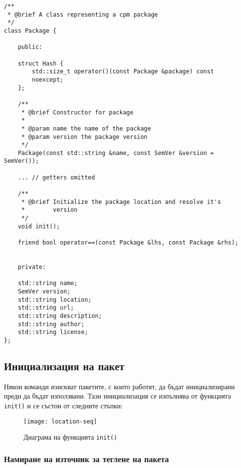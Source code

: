 
\begin{lstlisting}[style=cpp,
				   caption=Клас за пакет, label={lst:package}]
/**
 * @brief A class representing a cpm package
 */
class Package {

	public:

	struct Hash {
		std::size_t operator()(const Package &package) const
		noexcept;
	};

	/**
	 * @brief Constructor for package
	 * 
	 * @param name the name of the package
	 * @param version the package version
	 */
	Package(const std::string &name, const SemVer &version = SemVer());

	... // getters omitted

	/**
	 * @brief Initialize the package location and resolve it's
	 *		  version
	 */
	void init();

	friend bool operator==(const Package &lhs, const Package &rhs);


	private:

	std::string name;
	SemVer version;
	std::string location;
	std::string url;
	std::string description;
	std::string author;
	std::string license;
};
\end{lstlisting}


\subsection{Инициализация на пакет}

Някои команди изискват пакетите, с които работят, да бъдат инициализирани преди
да бъдат използвани. Тази инициализация се изпълнява от функцията
\texttt{init()}  и се състои от следните стъпки:

\begin{figure}[H]
    \centering
    \texttt{[image: location-seq]}
    \caption{Диаграма на функцията \texttt{init()}}
    \label{fig:location-seq}
\end{figure}

\subsubsection{Намиране на източник за теглене на пакета}

